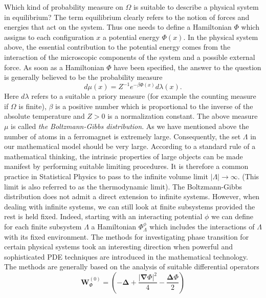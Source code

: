 \documentclass{article}
\begin{document}
Which kind of probability measure on $\Omega $ is suitable to describe a
physical system in equilibrium? The term equilibrium clearly refers to the
notion of forces and energies that act on the system. Thus one needs to
define a Hamiltonian $\Phi $ which assigns to each configuration $x$ a
potential energy $\Phi (x).$ In the physical system above, the essential
contribution to the potential energy comes from the interaction of the
microscopic components of the system and a possible external force. As soon
as a Hamiltonian $\Phi $ have been specified, the answer to the question is
generally believed to be the probability measure 
\begin{equation*}
d\mu (x)=Z^{-1}e^{-\beta \Phi (x)}d\lambda (x).
\end{equation*}%
Here $d\lambda $ refers to a suitable a priory measure (for example the
counting measure if $\Omega $ is finite), $\beta $ is a positive number
which is proportional to the inverse of the absolute temperature and $Z>0$
is a normalization constant. The above measure $\mu $ is called \textit{the
Boltzmann-Gibbs distribution}.\newline
As we have mentioned above the number of atoms in a ferromagnet is extremely
large. Consequently, the set $\Lambda $ in our mathematical model should be
very large. According to a standard rule of a mathematical thinking, the
intrinsic properties of large objects can be made manifest by performing
suitable limiting procedures. It is therefore a common practice in
Statistical Physics to pass to the infinite volume limit $\left| \Lambda
\right| \rightarrow \infty .$ (This limit is also referred to as the
thermodynamic limit). The Boltzmann-Gibbs distribution does not admit a
direct extension to infinite systems. However, when dealing with infinite
systems, we can still look at finite subsystems provided the rest is held
fixed. Indeed, starting with an interacting potential $\phi $ we can define
for each finite subsystem $\Lambda $ a Hamiltonian $\Phi _{\Lambda }^{\phi }$
which includes the interactions of $\Lambda $ with its fixed environment.%
\newline
The methods for investigating phase transition for certain physical systems
took an interesting direction when powerful and sophisticated PDE techniques
are introduced in the mathematical technology. The methods are generally
based on the analysis of suitable differential operators%
\begin{equation*}
\mathbf{W}_{\Phi }^{\left( 0\right) }=\left( \mathbf{-\Delta +}\frac{\left| 
\mathbf{\nabla }\Phi \right| ^{2}}{4}-\frac{\mathbf{\Delta }\Phi }{2}\right)
\end{equation*}%
\end{document}
